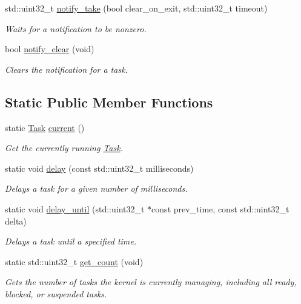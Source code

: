 \begin{DoxyCompactItemize}
std\+::uint32\+\_\+t \hyperlink{classpros_1_1Task_ab0424664979128a156fbcd2533a75da2}{notify\+\_\+take} (bool clear\+\_\+on\+\_\+exit, std\+::uint32\+\_\+t timeout)
\begin{DoxyCompactList}\small\item\em Waits for a notification to be nonzero. \end{DoxyCompactList}\item 
bool \hyperlink{classpros_1_1Task_a6fc6c97f2dd9fc92b6b9ff47557f215f}{notify\+\_\+clear} (void)
\begin{DoxyCompactList}\small\item\em Clears the notification for a task. \end{DoxyCompactList}\end{DoxyCompactItemize}
\subsection*{Static Public Member Functions}
\begin{DoxyCompactItemize}
\item 
static \hyperlink{classpros_1_1Task}{Task} \hyperlink{classpros_1_1Task_a510ca3e67e54aa4293438d73148a1d6b}{current} ()
\begin{DoxyCompactList}\small\item\em Get the currently running \hyperlink{classpros_1_1Task}{Task}. \end{DoxyCompactList}\item 
static void \hyperlink{classpros_1_1Task_a4341b580544831eea11b840cf068587b}{delay} (const std\+::uint32\+\_\+t milliseconds)
\begin{DoxyCompactList}\small\item\em Delays a task for a given number of milliseconds. \end{DoxyCompactList}\item 
static void \hyperlink{classpros_1_1Task_aa038d0eeb973ce7fca8689fa5bb91fec}{delay\+\_\+until} (std\+::uint32\+\_\+t $\ast$const prev\+\_\+time, const std\+::uint32\+\_\+t delta)
\begin{DoxyCompactList}\small\item\em Delays a task until a specified time. \end{DoxyCompactList}\item 
static std\+::uint32\+\_\+t \hyperlink{classpros_1_1Task_a9b1eda960abda807cb8447075fc4ea44}{get\+\_\+count} (void)
\begin{DoxyCompactList}\small\item\em Gets the number of tasks the kernel is currently managing, including all ready, blocked, or suspended tasks. \end{DoxyCompactList}\end{DoxyCompactItemize}


